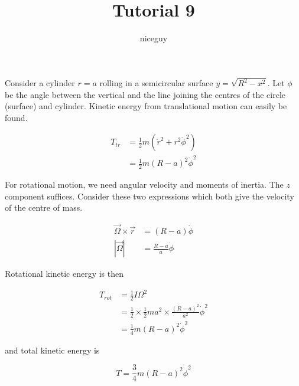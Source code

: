 \documentclass[12pt]{article}
\title{Tutorial 9}
\author{niceguy}
\begin{document}
\maketitle

Consider a cylinder $r = a$ rolling in a semicircular surface $y = \sqrt{R^2 - x^2}$. Let $\phi$ be the angle between the vertical and the line joining the centres of the circle (surface) and cylinder. Kinetic energy from translational motion can easily be found.

\begin{align*}
    T_{tr} &= \frac{1}{2}m(\dot r^2 + r^2\dot\phi^2) \\
           &= \frac{1}{2}m(R-a)^2\dot\phi^2
\end{align*}

For rotational motion, we need angular velocity and moments of inertia. The $z$ component suffices. Consider these two expressions which both give the velocity of the centre of mass.

\begin{align*}
    \vec\Omega \times \vec r &= (R-a)\dot\phi \\
    |\vec\Omega| &= \frac{R-a}{a}\dot\phi
\end{align*}

Rotational kinetic energy is then

\begin{align*}
    T_{rot} &= \frac{1}{2} I\Omega^2 \\
            &= \frac{1}{2} \times \frac{1}{2}m a^2 \times \frac{(R-a)^2}{a^2}\dot\phi^2 \\
            &= \frac{1}{4}m (R-a)^2\dot\phi^2
\end{align*}

and total kinetic energy is

$$T = \frac{3}{4}m(R-a)^2\dot\phi^2$$
\end{document}
